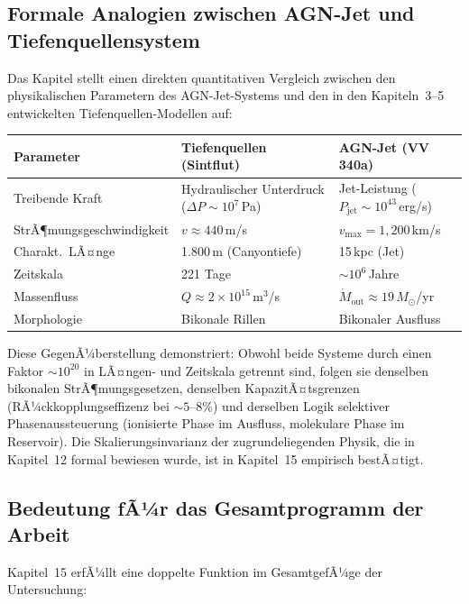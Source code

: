 ﻿\documentclass[12pt,a4paper]{report}
\begin{document}
\subsection{Formale Analogien zwischen AGN-Jet und Tiefenquellensystem}

Das Kapitel stellt einen direkten quantitativen Vergleich zwischen den physikalischen Parametern des AGN-Jet-Systems und den in den Kapiteln~3--5 entwickelten Tiefenquellen-Modellen auf:

\begin{center}
\begin{tabular}{p{4.5cm}p{4.5cm}p{3.8cm}}
	\hline
	\textbf{Parameter} & \textbf{Tiefenquellen (Sintflut)} & \textbf{AGN-Jet (VV\,340a)} \\
	\hline
	Treibende Kraft & Hydraulischer Unterdruck ($\Delta P \sim 10^7$\,Pa) & Jet-Leistung ($P_\mathrm{jet} \sim 10^{43}$\,erg/s) \\
	StrÃ¶mungsgeschwindigkeit & $v \approx 440$\,m/s & $v_\mathrm{max} = 1{,}200$\,km/s \\
	Charakt.\ LÃ¤nge & 1.800\,m (Canyontiefe) & 15\,kpc (Jet) \\
	Zeitskala & 221 Tage & $\sim 10^6$\,Jahre \\
	Massenfluss & $Q \approx 2\times10^{15}$\,m$^3$/s & $\dot{M}_\mathrm{out} \approx 19\,M_\odot$/yr \\
	Morphologie & Bikonale Rillen & Bikonaler Ausfluss \\
	\hline
\end{tabular}
\end{center}

Diese GegenÃ¼berstellung demonstriert: Obwohl beide Systeme durch einen Faktor $\sim 10^{20}$ in LÃ¤ngen- und Zeitskala getrennt sind, folgen sie denselben bikonalen StrÃ¶mungsge\-setzen, denselben KapazitÃ¤tsgrenzen (RÃ¼ckkopplungseffizenz bei $\sim 5$--$8\%$) und derselben Logik selektiver Phasenaussteuerung (ionisierte Phase im Ausfluss, molekulare Phase im Reservoir). Die Skalierungsinvarianz der zugrundeliegenden Physik, die in Kapitel~12 formal bewiesen wurde, ist in Kapitel~15 empirisch bestÃ¤tigt.

\subsection{Bedeutung fÃ¼r das Gesamtprogramm der Arbeit}

Kapitel~15 erfÃ¼llt eine doppelte Funktion im GesamtgefÃ¼ge der Untersuchung:
\end{document}
